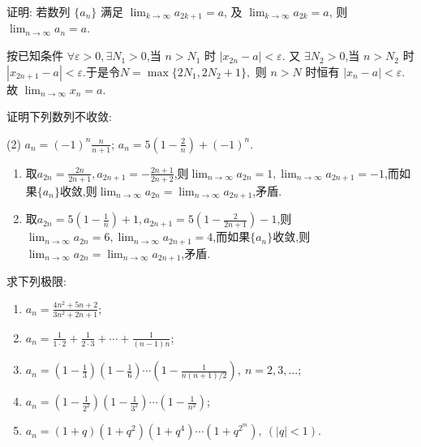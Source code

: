 \begin{exercise}[1.2.6]
    证明: 若数列 $\{a_n\}$ 满足 $\lim_{k\to\infty} a_{2k+1} = a$, 及 $\lim_{k\to\infty} a_{2k} = a$, 则 $\lim_{n\to\infty} a_n = a$.
\end{exercise}

\begin{solution}
    按已知条件 \(\forall \varepsilon > 0, \exists N_1 > 0\),当 \(n > N_1\) 时 \(|x_{2n} - a| < \varepsilon\).
    又 \(\exists N_2 > 0\),当 \(n > N_2\) 时 \(|x_{2n+1} - a| < \varepsilon\).于是令\( N = \max\{2N_1, 2N_2 + 1\}, \)
    则 \(n > N\) 时恒有 \(|x_n - a| < \varepsilon\).故 \(\lim_{n \to \infty} x_n = a\).

\end{solution}

\begin{exercise}[1.2.7]
    证明下列数列不收敛:
    \begin{tasks}[label=(\arabic*)](2)
        \task $a_n = (-1)^n \frac{n}{n+1}$;
        \task $a_n = 5 \left(1 - \frac{2}{n}\right) + (-1)^n$.
    \end{tasks}
\end{exercise}

\begin{solution}
    \begin{enumerate}[(1)]
        \item 取$a_{2n} = \frac{2n}{2n+1}, a_{2n+1} = -\frac{2n+1}{2n+2}$,则$\lim_{n \to \infty} a_{2n} = 1, \lim_{n \to \infty} a_{2n+1} = -1$,而如果$\{a_n\}$收敛,则$\lim_{n \to \infty} a_{2n} = \lim_{n \to \infty} a_{2n+1}$,矛盾.
        \item 取$a_{2n} = 5 \left(1 - \frac{1}{n}\right)+1, a_{2n+1} = 5 \left(1 - \frac{2}{2n+1}\right)-1$,则$\lim_{n \to \infty} a_{2n} = 6, \lim_{n \to \infty} a_{2n+1} = 4$,而如果$\{a_n\}$收敛,则$\lim_{n \to \infty} a_{2n} = \lim_{n \to \infty} a_{2n+1}$,矛盾.
    \end{enumerate}
\end{solution}

\begin{exercise}[1.2.8]
    求下列极限:
    \begin{enumerate}[(1)]
        \item $a_n = \frac{4n^2 + 5n + 2}{3n^2 + 2n + 1}$;
        \item $a_n = \frac{1}{1 \cdot 2} + \frac{1}{2 \cdot 3} + \cdots + \frac{1}{(n-1)n}$;
        \item $a_n = \left(1 - \frac{1}{3}\right) \left(1 - \frac{1}{6}\right) \cdots \left(1 - \frac{1}{n(n+1)/2}\right), \ n=2, 3, \ldots$;
        \item $a_n = \left(1 - \frac{1}{2^2}\right) \left(1 - \frac{1}{3^2}\right) \cdots \left(1 - \frac{1}{n^2}\right)$;
        \item $a_n = (1+q)(1+q^2)(1+q^4) \cdots (1+q^{2^m}), \ (|q|<1)$.
    \end{enumerate}
\end{exercise}

